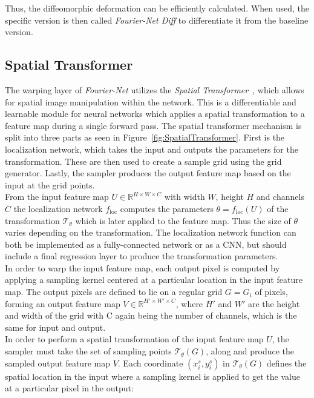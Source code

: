 \documentclass[english,version-2022-01]{uzl-thesis} %
\begin{document}
Thus, the diffeomorphic deformation can be efficiently calculated. When used, the specific version is then called \emph{Fourier-Net Diff} to differentiate it from the baseline version.


\subsection{Spatial Transformer} \label{SubSec:SpatialTransformer}
The warping layer of \emph{Fourier-Net} utilizes the \emph{Spatial Transformer}~\cite{SpatialTransformer}, which allows for spatial image manipulation within the network. This is a differentiable and learnable module for neural networks which applies a spatial transformation to a feature map during a single forward pass. The spatial transformer mechanism is split into three parts as seen in Figure~\ref{fig:SpatialTransformer}. First is the localization network, which takes the input and outputs the parameters for the transformation. These are then used to create a sample grid using the grid generator. Lastly, the sampler produces the output feature map based on the input at the grid points.\\
From the input feature map $U \in \mathbb{R}^{H \times W \times C}$ with width $W$, height $H$ and channels $C$ the localization network $f_{\text{loc}}$ computes the parameters $\theta = f_{\text{loc}}(U)$ of the transformation $\mathcal{T}_\theta$ which is later applied to the feature map. Thus the size of $\theta$ varies depending on the transformation. 
The localization network function can both be implemented as a fully-connected network or as a CNN, but should include a final regression layer to produce the transformation parameters.\\
In order to warp the input feature map, each output pixel is computed by applying a sampling kernel centered at a particular location in the input feature map. The output pixels are defined to lie on a regular grid $G = {G_i}$ of pixels, forming an output feature map $V \in \mathbb{R}^{H' \times W' \times C}$, where $H'$ and $W'$ are the height and width of the grid with C again being the number of channels, which is the same for input and output.\\
In order to perform a spatial transformation of the input feature map $U$, the sampler must take the set of sampling points $\mathcal{T}_\theta(G)$, along and produce the sampled output feature map $V$. Each coordinate $(x_i^s, y_i^s)$ in $\mathcal{T}_\theta(G)$ defines the spatial location in the input where a sampling kernel is applied to get the value at a particular pixel in the output:
\end{document}
